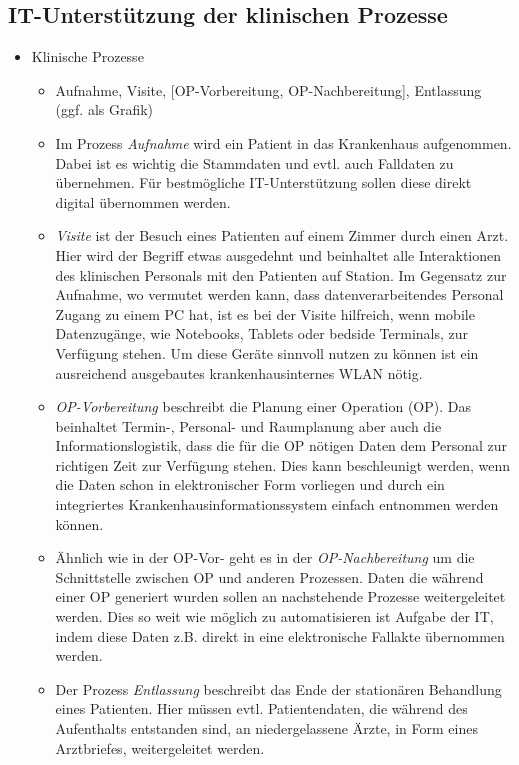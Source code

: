 	\subsection{IT-Unterstützung der klinischen Prozesse}
		\begin{itemize}
			\item Klinische Prozesse
			\begin{itemize}
				\item Aufnahme, Visite, [OP-Vorbereitung, OP-Nachbereitung], Entlassung (ggf. als Grafik) \parencite[37]{huebner2019}
				\item Im Prozess \textit{Aufnahme} wird ein Patient in das Krankenhaus aufgenommen. Dabei ist es wichtig die Stammdaten und evtl. auch Falldaten zu übernehmen. Für bestmögliche IT-Unterstützung sollen diese direkt digital übernommen werden. 
				\item \textit{Visite} ist der Besuch eines Patienten auf einem Zimmer durch einen Arzt. Hier wird der Begriff etwas ausgedehnt und beinhaltet alle Interaktionen des klinischen Personals mit den Patienten auf Station. Im Gegensatz zur Aufnahme, wo vermutet werden kann, dass datenverarbeitendes Personal Zugang zu einem PC hat, ist es bei der Visite hilfreich, wenn mobile Datenzugänge, wie Notebooks, Tablets oder bedside Terminals, zur Verfügung stehen. Um diese Geräte sinnvoll nutzen zu können ist ein ausreichend ausgebautes krankenhausinternes WLAN nötig.
				\item \textit{OP-Vorbereitung} beschreibt die Planung einer Operation (OP). Das beinhaltet Termin-, Personal- und Raumplanung aber auch die Informationslogistik, dass die für die OP nötigen Daten dem Personal zur richtigen Zeit zur Verfügung stehen. Dies kann beschleunigt werden, wenn die Daten schon in elektronischer Form vorliegen und durch ein integriertes Krankenhausinformationssystem einfach entnommen werden können.
				\item Ähnlich wie in der OP-Vor- geht es in der \textit{OP-Nachbereitung} um die Schnittstelle zwischen OP und anderen Prozessen. Daten die während einer OP generiert wurden sollen an nachstehende Prozesse weitergeleitet werden. Dies so weit wie möglich zu automatisieren ist Aufgabe der IT, indem diese Daten z.B. direkt in eine elektronische Fallakte übernommen werden.
				\item Der Prozess \textit{Entlassung} beschreibt das Ende der stationären Behandlung eines Patienten. Hier müssen evtl. Patientendaten, die während des Aufenthalts entstanden sind, an niedergelassene Ärzte, in Form eines Arztbriefes, weitergeleitet werden. 

\end{itemize}
\end{itemize}
